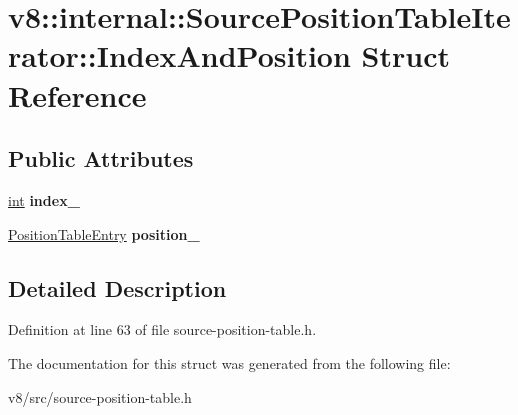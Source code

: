 \hypertarget{structv8_1_1internal_1_1SourcePositionTableIterator_1_1IndexAndPosition}{}\section{v8\+:\+:internal\+:\+:Source\+Position\+Table\+Iterator\+:\+:Index\+And\+Position Struct Reference}
\label{structv8_1_1internal_1_1SourcePositionTableIterator_1_1IndexAndPosition}
\subsection*{Public Attributes}
\begin{DoxyCompactItemize}
\item 
\mbox{\label{structv8_1_1internal_1_1SourcePositionTableIterator_1_1IndexAndPosition_a84bdb4ffc6f54cd30305a4c5f337793c}} 
\mbox{\hyperlink{classint}{int}} {\bfseries index\+\_\+}
\item 
\mbox{\label{structv8_1_1internal_1_1SourcePositionTableIterator_1_1IndexAndPosition_a0c393605bb4c0df09830a6da626ce00c}} 
\mbox{\hyperlink{structv8_1_1internal_1_1PositionTableEntry}{Position\+Table\+Entry}} {\bfseries position\+\_\+}
\end{DoxyCompactItemize}


\subsection{Detailed Description}


Definition at line 63 of file source-\/position-\/table.\+h.



The documentation for this struct was generated from the following file\+:\begin{DoxyCompactItemize}
\item 
v8/src/source-\/position-\/table.\+h\end{DoxyCompactItemize}
